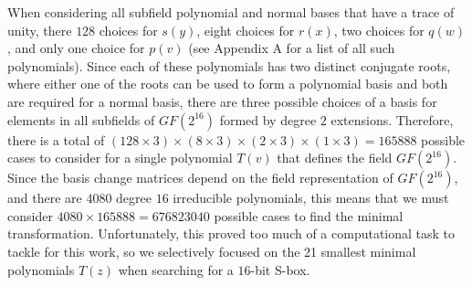 When considering all subfield polynomial and normal bases that have a trace of unity, there $128$ choices for $s(y)$, eight choices for $r(x)$, two choices for $q(w)$, and only one choice for $p(v)$ (see Appendix A for a list of all such polynomials). Since each of these polynomials has two distinct conjugate roots, where either one of the roots can be used to form a polynomial basis and both are required for a normal basis, there are three possible choices of a basis for elements in all subfields of $GF(2^{16})$ formed by degree $2$ extensions. Therefore, there is a total of $(128 \times 3) \times (8 \times 3) \times (2 \times 3) \times (1 \times 3) = 165888$ possible cases to consider for a single polynomial $T(v)$ that defines the field $GF(2^{16})$. Since the basis change matrices depend on the field representation of $GF(2^{16})$, and there are $4080$ degree $16$ irreducible polynomials, this means that we must consider $4080 \times 165888 = 676823040$ possible cases to find the minimal transformation. Unfortunately, this proved too much of a computational task to tackle for this work, so we selectively focused on the 21 smallest minimal polynomials $T(z)$ when searching for a $16$-bit S-box.



